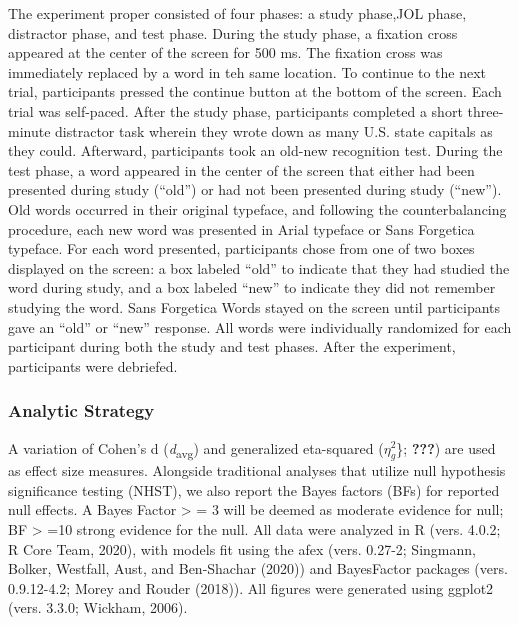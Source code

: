\documentclass[
  english,
  jou]{apa6}
\begin{document}
The experiment proper consisted of four phases: a study phase,JOL phase, distractor phase, and test phase. During the study phase, a fixation cross appeared at the center of the screen for 500 ms. The fixation cross was immediately replaced by a word in teh same location. To continue to the next trial, participants pressed the continue button at the bottom of the screen. Each trial was self-paced. After the study phase, participants completed a short three-minute distractor task wherein they wrote down as many U.S. state capitals as they could. Afterward, participants took an old-new recognition test. During the test phase, a word appeared in the center of the screen that either had been presented during study (\enquote{old}) or had not been presented during study (\enquote{new}). Old words occurred in their original typeface, and following the counterbalancing procedure, each new word was presented in Arial typeface or Sans Forgetica typeface. For each word presented, participants chose from one of two boxes displayed on the screen: a box labeled \enquote{old} to indicate that they had studied the word during study, and a box labeled \enquote{new} to indicate they did not remember studying the word. Sans Forgetica Words stayed on the screen until participants gave an \enquote{old} or \enquote{new} response. All words were individually randomized for each participant during both the study and test phases. After the experiment, participants were debriefed.

\hypertarget{analytic-strategy}{%
\subsubsection{Analytic Strategy}\label{analytic-strategy}}

A variation of Cohen's d (\emph{d}\textsubscript{avg}) and generalized eta-squared (\(\eta_{g}^{2}\)\}; {\textbf{???}}) are used as effect size measures. Alongside traditional analyses that utilize null hypothesis significance testing (NHST), we also report the Bayes factors (BFs) for reported null effects. A Bayes Factor \textgreater{} = 3 will be deemed as moderate evidence for null; BF \textgreater{} =10 strong evidence for the null. All data were analyzed in R (vers. 4.0.2; R Core Team, 2020), with models fit using the afex (vers. 0.27-2; Singmann, Bolker, Westfall, Aust, and Ben-Shachar (2020)) and BayesFactor packages (vers. 0.9.12-4.2; Morey and Rouder (2018)). All figures were generated using ggplot2 (vers. 3.3.0; Wickham, 2006).
\end{document}
